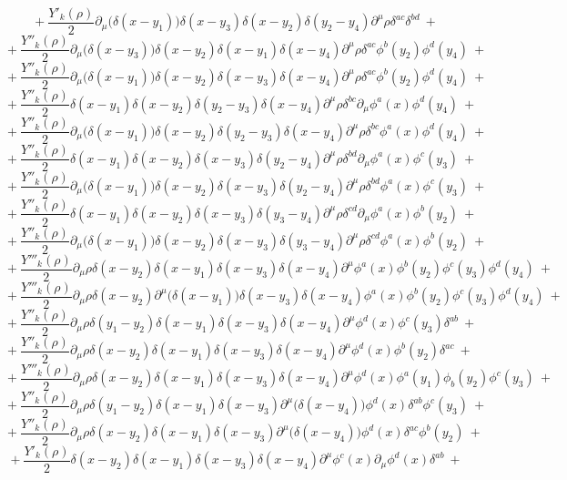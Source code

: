 $$+\ \frac{Y'_k(\rho)}{2}\partial_\mu\big(\delta(x - y_1)\big)\delta(x - y_3)\delta(x - y_2)\delta(y_2 - y_4)\partial^\mu\rho \delta^{ac}\delta^{bd} \ +$$
$$+\ \frac{Y''_k(\rho)}{2}\partial_\mu\big(\delta(x - y_3)\big)\delta(x - y_2)\delta(x - y_1)\delta(x - y_4)\partial^\mu\rho \delta^{ac}\phi^b(y_2)\phi^d(y_4) \ +$$
$$+\ \frac{Y''_k(\rho)}{2}\partial_\mu\big(\delta(x - y_1)\big)\delta(x - y_2)\delta(x - y_3)\delta(x - y_4)\partial^\mu\rho \delta^{ac}\phi^b(y_2)\phi^d(y_4) \ +$$
$$+\ \frac{Y''_k(\rho)}{2}\delta(x - y_1)\delta(x - y_2)\delta(y_2 - y_3)\delta(x - y_4)\partial^\mu\rho \delta^{bc}\partial_\mu\phi^a(x)\phi^d(y_4) \ +$$
$$+\ \frac{Y''_k(\rho)}{2}\partial_\mu\big(\delta(x - y_1)\big)\delta(x - y_2)\delta(y_2 - y_3)\delta(x - y_4)\partial^\mu\rho \delta^{bc}\phi^a(x)\phi^d(y_4) \ +$$
$$+\ \frac{Y''_k(\rho)}{2}\delta(x - y_1)\delta(x - y_2)\delta(x - y_3)\delta(y_2 - y_4)\partial^\mu\rho \delta^{bd}\partial_\mu\phi^a(x)\phi^c(y_3) \ +$$
$$+\ \frac{Y''_k(\rho)}{2}\partial_\mu\big(\delta(x - y_1)\big)\delta(x - y_2)\delta(x - y_3)\delta(y_2 - y_4)\partial^\mu\rho \delta^{bd}\phi^a(x)\phi^c(y_3) \ +$$
$$+\ \frac{Y''_k(\rho)}{2}\delta(x - y_1)\delta(x - y_2)\delta(x - y_3)\delta(y_3 - y_4)\partial^\mu\rho \delta^{cd}\partial_\mu\phi^a(x)\phi^b(y_2) \ +$$
$$+\ \frac{Y''_k(\rho)}{2}\partial_\mu\big(\delta(x - y_1)\big)\delta(x - y_2)\delta(x - y_3)\delta(y_3 - y_4)\partial^\mu\rho \delta^{cd}\phi^a(x)\phi^b(y_2) \ +$$
$$+\ \frac{Y'''_k(\rho)}{2}\partial_\mu\rho\delta(x - y_2)\delta(x - y_1)\delta(x - y_3)\delta(x - y_4)\partial^\mu\phi^a(x)\phi^b(y_2)\phi^c(y_3)\phi^d(y_4) \ +$$
$$+\ \frac{Y'''_k(\rho)}{2}\partial_\mu\rho\delta(x - y_2)\partial^\mu\big(\delta(x - y_1)\big)\delta(x - y_3)\delta(x - y_4)\phi^a(x)\phi^b(y_2)\phi^c(y_3)\phi^d(y_4) \ +$$
$$+\ \frac{Y''_k(\rho)}{2}\partial_\mu\rho\delta(y_1 - y_2)\delta(x - y_1)\delta(x - y_3)\delta(x - y_4)\partial^\mu\phi^d(x)\phi^c(y_3)\delta^{ab} \ +$$
$$+\ \frac{Y''_k(\rho)}{2}\partial_\mu\rho\delta(x - y_2)\delta(x - y_1)\delta(x - y_3)\delta(x - y_4)\partial^\mu\phi^d(x)\phi^b(y_2)\delta^{ac} \ +$$
$$+\ \frac{Y'''_k(\rho)}{2}\partial_\mu\rho\delta(x - y_2)\delta(x - y_1)\delta(x - y_3)\delta(x - y_4)\partial^\mu\phi^d(x)\phi^a(y_1)\phi_b(y_2)\phi^c(y_3) \ +$$
$$+\ \frac{Y''_k(\rho)}{2}\partial_\mu\rho\delta(y_1 - y_2)\delta(x - y_1)\delta(x - y_3)\partial^\mu\big(\delta(x - y_4)\big)\phi^d(x)\delta^{ab}\phi^c(y_3) \ +$$
$$+\ \frac{Y''_k(\rho)}{2}\partial_\mu\rho\delta(x - y_2)\delta(x - y_1)\delta(x - y_3)\partial^\mu\big(\delta(x - y_4)\big)\phi^d(x)\delta^{ac}\phi^b(y_2) \ +$$
$$+\ \frac{Y'_k(\rho)}{2}\delta(x - y_2)\delta(x - y_1)\delta(x - y_3)\delta(x - y_4)\partial^\mu\phi^c(x)\partial_\mu\phi^d(x)\delta^{ab} \ +$$
